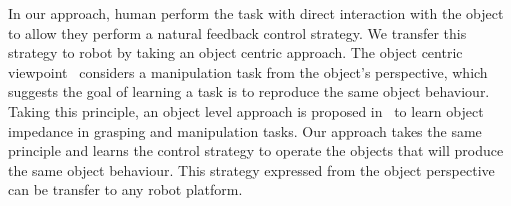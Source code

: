 In our approach, human perform the task with direct interaction with the object to allow they perform a natural feedback control strategy. We transfer this strategy to robot by taking an object centric approach. The object centric viewpoint~\cite{okamura2000overview} considers a manipulation task from the object's perspective, which suggests the goal of learning a task is to reproduce the same object behaviour. Taking this principle, an object level approach is proposed in~\cite{Miao2014} to learn object impedance in grasping and manipulation tasks. Our approach takes the same principle and learns the control strategy to operate the objects that will produce the same object behaviour. This strategy expressed from the object perspective can be transfer to any robot platform.


%


